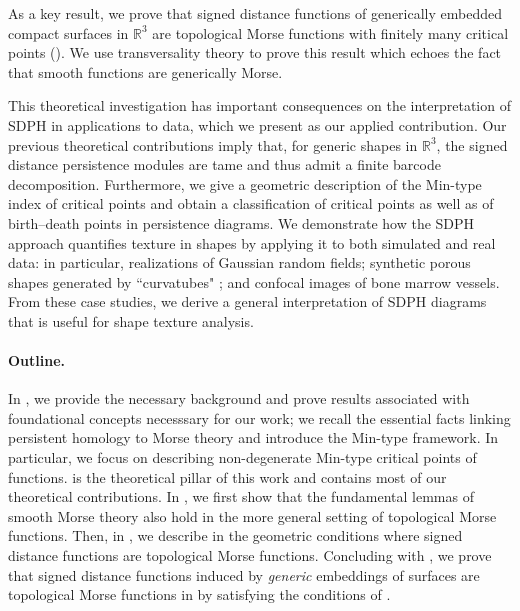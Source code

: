 \documentclass[11pt]{article}
\newcommand{\R}{\mathbb{R}}
\theoremstyle{plain}
\theoremstyle{definition}
\theoremstyle{remark}
\begin{document}
As a key result, we prove that signed distance functions of generically embedded compact surfaces in $\R^3$ are topological Morse functions with finitely many critical points (). We use transversality theory \citep{abraham_transversal_1967} to prove this result which echoes the fact that smooth functions are generically Morse.


This theoretical investigation has important consequences on the interpretation of SDPH in applications to data, which we present as our applied contribution. Our previous theoretical contributions imply that, for generic shapes in $\R^3$, the signed distance persistence modules are tame and thus admit a finite barcode decomposition. Furthermore, we give a geometric description of the Min-type index of critical points and obtain a classification of critical points as well as of birth--death points in persistence diagrams.
We demonstrate how the SDPH approach quantifies texture in shapes by applying it to both simulated and real data: in particular, realizations of Gaussian random fields; synthetic porous shapes generated by ``curvatubes" \citep{song_generation_2021}; and confocal images of bone marrow vessels. From these case studies, we derive a general interpretation of SDPH diagrams that is useful for shape texture analysis.


\paragraph{Outline.} 
In , we provide the necessary background and prove results associated with foundational concepts necesssary for our work; we recall the essential facts linking persistent homology to Morse theory and introduce the Min-type framework. In particular, we focus on describing non-degenerate Min-type critical points of functions.  is the theoretical pillar of this work and contains most of our theoretical contributions. In , we first show that the fundamental lemmas of smooth Morse theory also hold in the more general setting of topological Morse functions.
Then, in , we describe in  the geometric conditions where signed distance functions are topological Morse functions. Concluding with , we prove that signed distance functions induced by \emph{generic} embeddings of surfaces are topological Morse functions in  by satisfying the conditions of .
\end{document}
